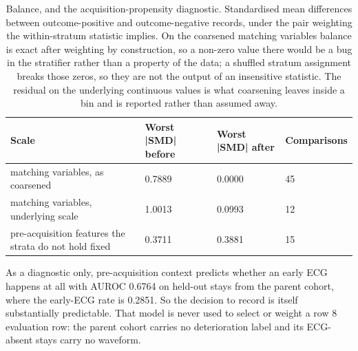 \begin{table}[t]
\centering
\small
\caption{Balance, and the acquisition-propensity diagnostic. Standardised mean differences between outcome-positive and outcome-negative records, under the pair weighting the within-stratum statistic implies. On the coarsened matching variables balance is exact after weighting by construction, so a non-zero value there would be a bug in the stratifier rather than a property of the data; a shuffled stratum assignment breaks those zeros, so they are not the output of an insensitive statistic. The residual on the underlying continuous values is what coarsening leaves inside a bin and is reported rather than assumed away.}
\label{tab:balance}
\begin{tabular}{llll}
\toprule
Scale & Worst |SMD| before & Worst |SMD| after & Comparisons \\
\midrule
matching variables, as coarsened & 0.7889 & 0.0000 & 45 \\
matching variables, underlying scale & 1.0013 & 0.0993 & 12 \\
pre-acquisition features the strata do not hold fixed & 0.3711 & 0.3881 & 15 \\
\bottomrule
\end{tabular}
\par\footnotesize As a diagnostic only, pre-acquisition context predicts whether an early ECG happens at all with AUROC 0.6764 on held-out stays from the parent cohort, where the early-ECG rate is 0.2851. So the decision to record is itself substantially predictable. That model is never used to select or weight a row 8 evaluation row: the parent cohort carries no deterioration label and its ECG-absent stays carry no waveform.
\end{table}

